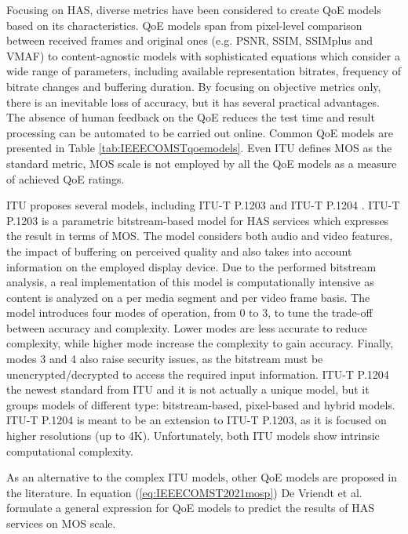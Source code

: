 Focusing on HAS, diverse metrics have been considered to create QoE models based on its characteristics.
QoE models span from pixel-level comparison between received frames and original ones (e.g. PSNR, SSIM, SSIMplus and VMAF) to \hbox{content-agnostic} models with sophisticated equations which consider a wide range of parameters, including available representation bitrates, frequency of bitrate changes and buffering duration.
By focusing on objective metrics only, there is an inevitable loss of accuracy, but it has several practical advantages. The absence of human feedback on the QoE reduces the test time and result processing can be automated to be carried out online. Common QoE models are presented in Table \ref{tab:IEEECOMSTqoemodels}. Even ITU defines MOS as the standard metric, MOS scale is not employed by all the QoE models as a measure of achieved QoE ratings.

ITU proposes several models, including ITU-T P.1203 \cite{itup1203} and ITU-T P.1204 \cite{itup1204}. ITU-T P.1203 \cite{itup1203} is a parametric bitstream-based model for HAS services which expresses the result in terms of MOS. The model considers both audio and video features, the impact of buffering on perceived quality and also takes into account information on the employed display device. Due to the performed bitstream analysis, a real implementation \cite{Robitza2018} of this model is computationally intensive as content is analyzed on a per media segment and per video frame basis. The model introduces four modes of operation, from 0 to 3,  to tune the trade-off between accuracy and complexity. Lower modes are less accurate to reduce complexity, while higher mode increase the complexity to gain accuracy. Finally, modes 3 and 4 also raise security issues, as the bitstream must be unencrypted/decrypted to access the required input information. ITU-T P.1204 \cite{itup1204} the newest standard from ITU and it is not actually a unique model, but it groups models of different type: bitstream-based, pixel-based and hybrid models. ITU-T P.1204 is meant to be an extension to ITU-T P.1203, as it is focused on higher resolutions (up to 4K). Unfortunately, both ITU models show intrinsic computational complexity.

As an alternative to the complex ITU models, other QoE models are proposed in the literature. In equation (\ref{eq:IEEECOMST2021mosp}) De Vriendt et al. \cite{DeVriendt2013} formulate a general expression for QoE models to predict the results of HAS services on MOS scale.

